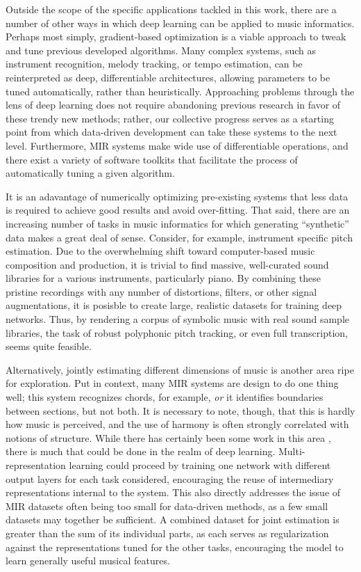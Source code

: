 Outside the scope of the specific applications tackled in this work, there are a number of other ways in which deep learning can be applied to music informatics.
Perhaps most simply, gradient-based optimization is a viable approach to tweak and tune previous developed algorithms.
Many complex systems, such as instrument recognition, melody tracking, or tempo estimation, can be reinterpreted as deep, differentiable architectures, allowing parameters to be tuned automatically, rather than heuristically.
Approaching problems through the lens of deep learning does not require abandoning previous research in favor of these trendy new methods;
rather, our collective progress serves as a starting point from which data-driven development can take these systems to the next level.
Furthermore, MIR systems make wide use of differentiable operations, and there exist a variety of software toolkits that facilitate the process of automatically tuning a given algorithm.

It is an adavantage of numerically optimizing pre-existing systems that less data is required to achieve good results and avoid over-fitting.
That said, there are an increasing number of tasks in music informatics for which generating ``synthetic'' data makes a great deal of sense.
Consider, for example, instrument specific pitch estimation.
Due to the overwhelming shift toward computer-based music composition and production, it is trivial to find massive, well-curated sound libraries for a various instruments, particularly piano.
By combining these pristine recordings with any number of distortions, filters, or other signal augmentations, it is posisble to create large, realistic datasets for training deep networks.
Thus, by rendering a corpus of symbolic music with real sound sample libraries, the task of robust polyphonic pitch tracking, or even full transcription, seems quite feasible.

Alternatively, jointly estimating different dimensions of music is another area ripe for exploration.
Put in context, many MIR systems are design to do one thing well;
this system recognizes chords, for example, \emph{or} it identifies boundaries between sections, but not both.
It is necessary to note, though, that this is hardly how music is perceived, and the use of harmony is often strongly correlated with notions of structure.
While there has certainly been some work in this area \cite{Papadopoulos2011Joint}, there is much that could be done in the realm of deep learning.
Multi-representation learning could proceed by training one network with different output layers for each task considered, encouraging the reuse of intermediary representations internal to the system.
This also directly addresses the issue of MIR datasets often being too small for data-driven methods, as a few small datasets may together be sufficient.
A combined dataset for joint estimation is greater than the sum of its individual parts, as each serves as regularization against the representations tuned for the other tasks, encouraging the model to learn generally useful musical features.

